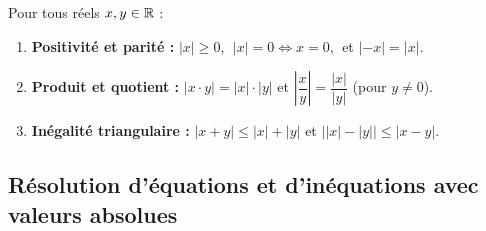 \begin{theoreme}
Pour tous réels $x, y \in \mathbb{R}$ :
\begin{enumerate}
    \item \textbf{Positivité et parité :} $|x| \ge 0$, $\;|x| = 0 \iff x = 0$, $\;$et $|-x| = |x|$.
    \item \textbf{Produit et quotient :} $|x \cdot y| = |x| \cdot |y|$ \quad et \quad $\left|\dfrac{x}{y}\right| = \dfrac{|x|}{|y|}$ (pour $y \neq 0$).
    \item \textbf{Inégalité triangulaire :} $|x + y| \le |x| + |y|$ \quad et \quad $\bigl||x| - |y|\bigr| \le |x - y|$.
\end{enumerate}
\end{theoreme}

\subsection{Résolution d'équations et d'inéquations avec valeurs absolues}

